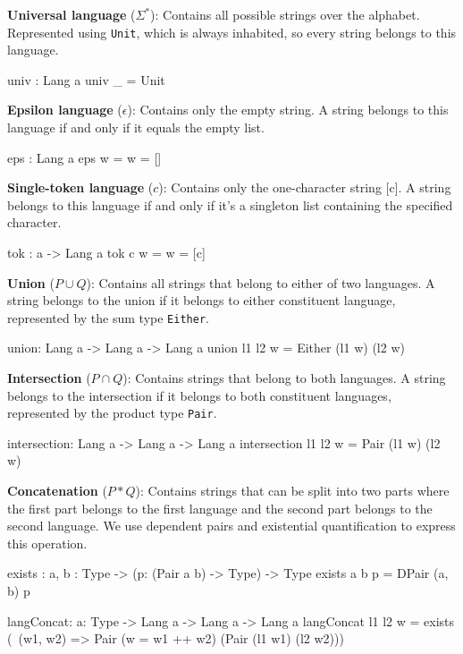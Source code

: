 \documentclass[]{rptuseminar}
\begin{document}
\textbf{Universal language} ($\Sigma^*$): Contains all possible strings over the alphabet. Represented using \texttt{Unit}, which is always inhabited, so every string belongs to this language.
\begin{idris}
univ : Lang a
univ _ = Unit 
\end{idris}

\textbf{Epsilon language} ($\epsilon$): Contains only the empty string. A string belongs to this language if and only if it equals the empty list.
\begin{idris}
eps : Lang a
eps w = w = []
\end{idris}

\textbf{Single-token language} ($c$): Contains only the one-character string [c]. A string belongs to this language if and only if it's a singleton list containing the specified character.
\begin{idris}
tok : a -> Lang a
tok c w = w = [c]
\end{idris}

\textbf{Union} ($P \cup Q$): Contains all strings that belong to either of two languages. A string belongs to the union if it belongs to either constituent language, represented by the sum type \texttt{Either}.
\begin{idris}
union: Lang a -> Lang a -> Lang a
union l1 l2 w = Either (l1 w) (l2 w)
\end{idris}

\textbf{Intersection} ($P \cap Q$): Contains strings that belong to both languages. A string belongs to the intersection if it belongs to both constituent languages, represented by the product type \texttt{Pair}.
\begin{idris}
intersection: Lang a -> Lang a -> Lang a
intersection l1 l2 w = Pair (l1 w) (l2 w)
\end{idris}

\textbf{Concatenation} ($P \ast Q$): Contains strings that can be split into two parts where the first part belongs to the first language and the second part belongs to the second language. We use dependent pairs and existential quantification to express this operation.
\begin{idris}
exists : {a, b : Type} -> (p: (Pair a b) -> Type) -> Type 
exists {a} {b} p = DPair (a, b) p 

langConcat: {a: Type} -> Lang a -> Lang a -> Lang a  
langConcat l1 l2 w = exists (\ (w1, w2) => 
                       Pair (w = w1 ++ w2) (Pair (l1 w1) (l2 w2)))
\end{idris}
\end{document}
